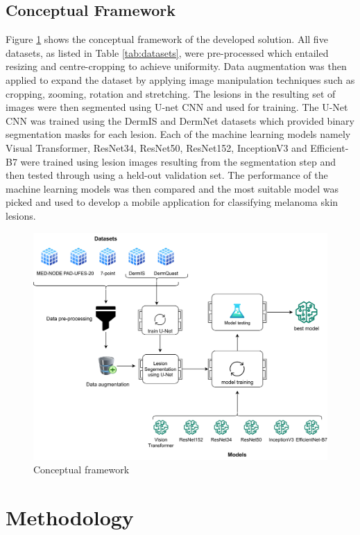 \documentclass[12pt, a4paper]{article}
\begin{document}
\subsection{Conceptual Framework}
Figure \ref{fig:concept} shows the conceptual framework of the developed solution. All five datasets, as listed in Table \ref{tab:datasets}, were pre-processed which entailed resizing and centre-cropping to achieve uniformity. Data augmentation was then applied to expand the dataset by applying image manipulation techniques such as cropping, zooming, rotation and stretching. The lesions in the resulting set of images were then segmented using U-net CNN and used for training. The U-Net CNN was trained using the DermIS and DermNet datasets which provided binary segmentation masks for each lesion. Each of the machine learning models namely Visual Transformer, ResNet34, ResNet50, ResNet152,  InceptionV3 and Efficient-B7 were trained using lesion images resulting from the segmentation step and then tested through using a held-out validation set. The performance of the machine learning models was then compared and the most suitable model was picked and used to develop a mobile application for classifying melanoma skin lesions.
\begin{figure}[h]
    \centering
    \setlength{\fboxsep}{8pt}
    \includegraphics[scale=0.1, fbox]{concept.png}
    \caption{Conceptual framework}
    \label{fig:concept}
\end{figure}
\clearpage
\section{Methodology}
\end{document}
